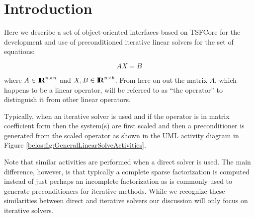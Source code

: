 \documentclass[pdf,ps2pdf,11pt]{SANDreport}
\begin{document}

%
\SANDmain %

\section{Introduction}

Here we describe a set of object-oriented interfaces based on TSFCore
{}\cite{ref:TSFCore} for the development and use of preconditioned
iterative linear solvers for the set of equations:

\begin{equation}
A X = B
\label{belos:eqn:AX=B}
\end{equation}

{}\noindent{}where $A\in\mbox{\textbf{I}}\hspace{-0.6ex}\mbox{\textbf{R}}^{n \times n}$ and $X, B \in\mbox{\textbf{I}}\hspace{-0.6ex}\mbox{\textbf{R}}^{n \times
b}$.  From here on out the matrix $A$, which happens to be a linear
operator, will be referred to as ``the operator'' to distinguish it
from other linear operators.

Typically, when an iterative solver is used and if the operator is in
matrix coefficient form then the system(s) are first scaled and then a
preconditioner is generated from the scaled operator as shown in the
UML {}\cite{ref:booch_et_al_1999} activity diagram in Figure
{}\ref{belos:fig:GeneralLinearSolveActivities}.

Note that similar activities are performed when a direct solver is
used.  The main difference, however, is that typically a complete
sparse factorization is computed instead of just perhaps an incomplete
factorization as is commonly used to generate preconditioners for
iterative methods.  While we recognize these similarities between
direct and iterative solvers our discussion will only focus on
iterative solvers.
\end{document}

